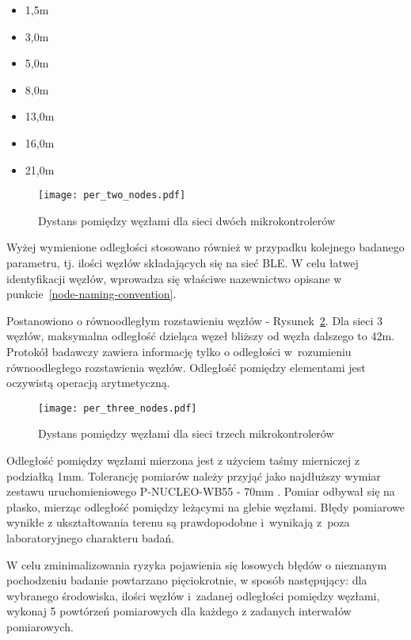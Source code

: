 \begin{itemize}
\item 1,5m
\item 3,0m
\item 5,0m
\item 8,0m
\item 13,0m
\item 16,0m
\item 21,0m
\end{itemize}

\begin{figure}[!ht]
	\centering \texttt{[image: per\_two\_nodes.pdf]} 
	\caption{Dystans pomiędzy węzłami dla sieci dwóch mikrokontrolerów}
	\label{rys:two_nodes_setup}
\end{figure}

Wyżej wymienione odległości stosowano również w przypadku kolejnego badanego parametru, tj. ilości węzłów
składających się na sieć BLE. W celu łatwej identyfikacji węzłów, wprowadza się właściwe nazewnictwo
opisane w punkcie~\ref{node-naming-convention}.

Postanowiono o równoodległym rozstawieniu węzłów - Rysunek~\ref{rys:three_nodes_setup}. Dla sieci 3 węzłów,
maksymalna odległość dzieląca węzeł bliższy od węzła dalszego to 42m. Protokół badawczy zawiera informację 
tylko o odległości w~rozumieniu równoodległego rozstawienia węzłów. Odległość pomiędzy elementami 
jest oczywistą operacją arytmetyczną.

\begin{figure}[!ht]
	\centering \texttt{[image: per\_three\_nodes.pdf]} 
	\caption{Dystans pomiędzy węzłami dla sieci trzech mikrokontrolerów}
	\label{rys:three_nodes_setup}
\end{figure}

Odległość pomiędzy węzłami mierzona jest z użyciem taśmy mierniczej z podziałką 1mm. Tolerancję pomiarów należy
przyjąć jako najdłuższy wymiar zestawu uruchomieniowego P-NUCLEO-WB55 - 70mm \cite{stmicroelectronics_um2435_2019}.
Pomiar odbywał się na płasko, mierząc odległość pomiędzy leżącymi na glebie węzłami. Błędy pomiarowe wynikłe
z ukształtowania terenu są prawdopodobne i~wynikają z~poza laboratoryjnego charakteru badań.

W celu zminimalizowania ryzyka pojawienia się losowych błędów o nieznanym pochodzeniu badanie powtarzano pięciokrotnie,
w sposób następujący: dla wybranego środowiska, ilości węzłów i~zadanej odległości pomiędzy węzłami, wykonaj
5 powtórzeń pomiarowych dla każdego z zadanych interwałów pomiarowych.

